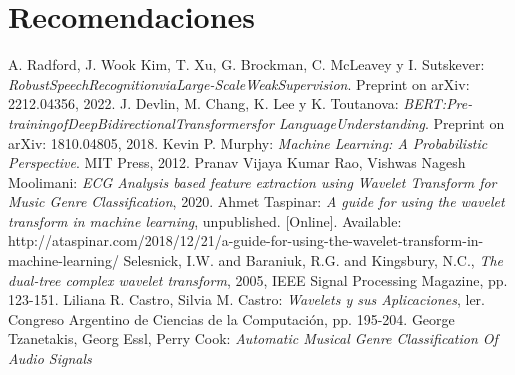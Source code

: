 \documentclass[colorinlistoftodos,twoside,twocolumn,10pt]{article} %
\begin{document}
	\section{Recomendaciones}
	    
	\begin{thebibliography}{20}
		 A. Radford, J. Wook Kim, T. Xu, G. Brockman, C. McLeavey y I. Sutskever: \emph{RobustSpeechRecognitionviaLarge-ScaleWeakSupervision}. Preprint on arXiv: 2212.04356, 2022. 	
		 J. Devlin, M. Chang, K. Lee y K. Toutanova: \emph{BERT:Pre-trainingofDeepBidirectionalTransformersfor LanguageUnderstanding}. Preprint on arXiv: 1810.04805, 2018. 
		 Kevin P. Murphy: \emph{Machine Learning: A Probabilistic Perspective}. MIT Press, 2012.
		 Pranav Vijaya Kumar Rao, Vishwas Nagesh Moolimani: \emph{ECG Analysis based feature extraction using Wavelet Transform for Music Genre Classification}, 2020. 
		 Ahmet Taspinar: \emph{A guide for using the wavelet transform in machine learning}, unpublished. [Online]. Available: http://ataspinar.com/2018/12/21/a-guide-for-using-the-wavelet-transform-in-machine-learning/
		 Selesnick, I.W. and Baraniuk, R.G. and Kingsbury, N.C., \emph{The dual-tree complex wavelet transform}, 2005, IEEE Signal Processing Magazine, pp. 123-151.
		 Liliana R. Castro, Silvia M.  Castro: \emph{Wavelets y sus Aplicaciones}, ler. Congreso Argentino de Ciencias de la Computación, pp. 195-204.
		 George Tzanetakis, Georg Essl, Perry Cook: \emph{Automatic Musical Genre Classification Of Audio Signals}
	\end{thebibliography}
	
\end{document}
